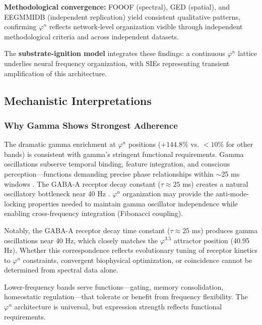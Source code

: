 \documentclass[11pt,a4paper]{article}
\newcommand{\phisym}{\varphi}
\begin{document}
\textbf{Methodological convergence:} FOOOF (spectral), GED (spatial), and EEGMMIDB (independent replication) yield consistent qualitative patterns, confirming $\phisym^n$ reflects network-level organization visible through independent methodological criteria and across independent datasets.

The \textbf{substrate-ignition model} integrates these findings: a continuous $\phisym^n$ lattice underlies neural frequency organization, with SIEs representing transient amplification of this architecture.

\subsection{Mechanistic Interpretations}

\subsubsection{Why Gamma Shows Strongest Adherence}
The dramatic gamma enrichment at $\phisym^n$ positions ($+144.8\%$ vs. $<10\%$ for other bands) is consistent with gamma's stringent functional requirements. Gamma oscillations subserve temporal binding, feature integration, and conscious perception---functions demanding precise phase relationships within $\sim$25 ms windows \parencite{canolty2010functional, lisman2013thetagamma}. The GABA-A receptor decay constant ($\tau \approx 25$ ms) creates a natural oscillatory bottleneck near 40 Hz \parencite{bartos2007synaptic}. $\phisym^n$ organization may provide the anti-mode-locking properties needed to maintain gamma oscillator independence while enabling cross-frequency integration (Fibonacci coupling).

Notably, the GABA-A receptor decay time constant ($\tau \approx 25$ ms) produces gamma oscillations near 40 Hz, which closely matches the $\phisym^{3.5}$ attractor position (40.95 Hz). Whether this correspondence reflects evolutionary tuning of receptor kinetics to $\phisym^n$ constraints, convergent biophysical optimization, or coincidence cannot be determined from spectral data alone.

Lower-frequency bands serve functions---gating, memory consolidation, homeostatic regulation---that tolerate or benefit from frequency flexibility. The $\phisym^n$ architecture is universal, but expression strength reflects functional requirements.
\end{document}
